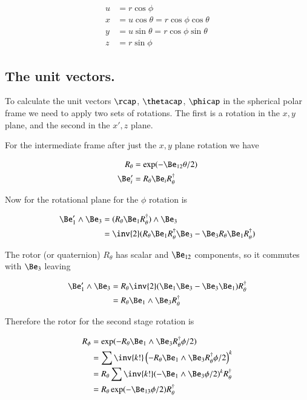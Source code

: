 \begin{align}\label{eqn:sphericalPolar:coordinates}
u &= r \cos\phi \\
x &= u \cos\theta = r \cos\phi \cos\theta \\
y &= u \sin\theta = r \cos\phi \sin\theta \\
z &= r \sin\phi
\end{align}

\subsection{The unit vectors. }

To calculate the unit vectors $\rcap$, $\thetacap$, $\phicap$ in the spherical polar frame we need to apply two sets of rotations.  The first is a rotation 
in the $x,y$ plane, and the second in the $x', z$ plane.

For the intermediate frame after just the $x,y$ plane rotation we have

\begin{align*}
R_\theta &= \exp(-\Be_{12}\theta/2) \\
\Be_i' &= R_\theta \Be_i R_\theta^\dagger
\end{align*}

Now for the rotational plane for the $\phi$ rotation is

\begin{align*}
\Be_1' \wedge \Be_3 
&= (R_\theta \Be_1 R_\theta^\dagger) \wedge \Be_3 \\
&= \inv{2} ( R_\theta \Be_1 R_\theta^\dagger \Be_3 - \Be_3 R_\theta \Be_1 R_\theta^\dagger ) \\
\end{align*}

The rotor (or quaternion) $R_\theta$ has scalar and $\Be_{12}$ components, so it commutes with $\Be_3$ leaving

\begin{align*}
\Be_1' \wedge \Be_3 
&= R_\theta \inv{2} ( \Be_1 \Be_3 - \Be_3 \Be_1 ) R_\theta^\dagger \\
&= R_\theta \Be_1 \wedge \Be_3 R_\theta^\dagger \\
\end{align*}

Therefore the rotor for the second stage rotation is

\begin{align*}
R_\phi 
&= \exp( - R_\theta \Be_1 \wedge \Be_3 R_\theta^\dagger \phi/2 ) \\
&= \sum \inv{k!} \left( - R_\theta \Be_1 \wedge \Be_3 R_\theta^\dagger \phi/2 \right)^k \\
&= R_\theta \sum \inv{k!} ( - \Be_1 \wedge \Be_3 \phi/2 )^k R_\theta^\dagger \\
&= R_\theta \exp( - \Be_{13} \phi/2 ) R_\theta^\dagger \\
\end{align*}

